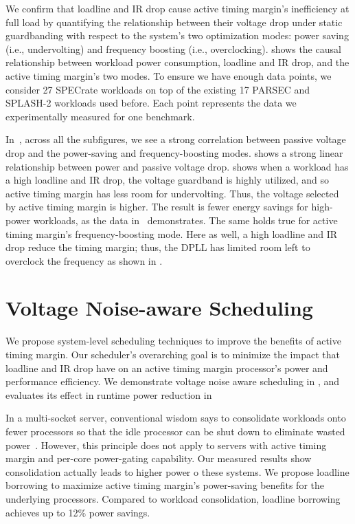 We confirm that loadline and IR drop cause active timing margin's inefficiency at full load by quantifying the relationship between their voltage drop under static guardbanding with respect to the system's two optimization modes: power saving (i.e., undervolting) and frequency boosting (i.e., overclocking).  shows the causal relationship between workload power consumption, loadline and IR drop, and the active timing margin's two modes. To ensure we have enough data points, we consider 27 SPECrate workloads on top of the existing 17 PARSEC and SPLASH-2 workloads used before. Each point represents the data we experimentally measured for one benchmark.

In~, across all the subfigures, we see a strong correlation between passive voltage drop and the power-saving and frequency-boosting modes.  shows a strong linear relationship between power and passive voltage drop.  shows when a workload has a high loadline and IR drop, the voltage guardband is highly utilized, and so active timing margin has less room for undervolting. Thus, the voltage selected by active timing margin is higher. The result is fewer energy savings for high-power workloads, as the data in~ demonstrates. The same holds true for active timing margin's frequency-boosting mode. Here as well, a high loadline and IR drop reduce the timing margin; thus, the DPLL has limited room left to overclock the frequency as shown in .

\section{Voltage Noise-aware Scheduling}
\label{sec:voltage:opt}

We propose system-level scheduling techniques to improve the benefits of active timing margin. Our scheduler's overarching goal is to minimize the impact that loadline and IR drop have on an active timing margin processor's power and performance efficiency. We demonstrate voltage noise aware scheduling in , and evaluates its effect in runtime power reduction in 

In a multi-socket server, conventional wisdom says to consolidate workloads onto fewer processors so that the idle processor can be shut down to eliminate wasted power~\cite{murthy2013linux,lo2014towards,leverich2014reconciling}. However, this principle does not apply to servers with active timing margin and per-core power-gating capability. Our measured results show consolidation actually leads to higher power o these systems. We propose loadline borrowing to maximize active timing margin's power-saving benefits for the underlying processors. Compared to workload consolidation, loadline borrowing achieves up to 12\% power savings.

